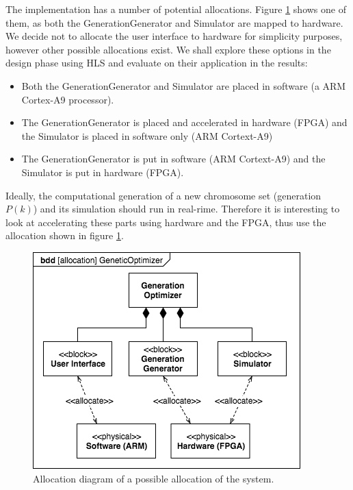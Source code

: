 The implementation has a number of potential allocations. Figure \ref{fig:allocation} shows one of them, as both the GenerationGenerator and Simulator are mapped to hardware. We decide not to allocate the user interface to hardware for simplicity purposes, however other possible allocations exist. We shall explore these options in the design phase using HLS and evaluate on their application in the results:

\begin{itemize} 
	\item Both the GenerationGenerator and Simulator are placed in software (a ARM Cortex-A9 processor).
	\item The GenerationGenerator is placed and accelerated in hardware (FPGA) and the Simulator is placed in software only (ARM Cortext-A9)
	\item The GenerationGenerator is put in software (ARM Cortext-A9) and the Simulator is put in hardware (FPGA).
\end{itemize}

Ideally, the computational generation of a new chromosome set (generation $P(k)$) and its simulation should run in real-rime. Therefore it is interesting to look at accelerating these parts using hardware and the FPGA, thus use the allocation shown in figure \ref{fig:allocation}.

\begin{figure}[h]
	\centering
	\includegraphics[width=0.9\linewidth]{../diagrams/allocation.png}
	\caption{Allocation diagram of a possible allocation of the system.}
	\label{fig:allocation}
\end{figure}

